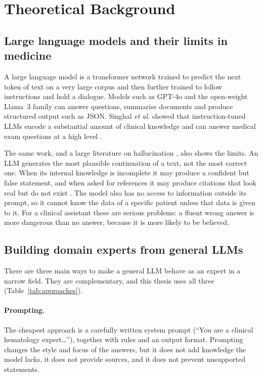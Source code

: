 \section{Theoretical Background}\label{sec:background}

\subsection{Large language models and their limits in medicine}

A large language model is a transformer network trained to predict the next token of text on a very large corpus and then further trained to follow instructions and hold a dialogue. Models such as GPT-4o \cite{openai2024gpt4o} and the open-weight Llama~3 family \cite{grattafiori2024llama3} can answer questions, summarise documents and produce structured output such as JSON. Singhal \emph{et al.} showed that instruction-tuned LLMs encode a substantial amount of clinical knowledge and can answer medical exam questions at a high level \cite{singhal2023}.

The same work, and a large literature on hallucination \cite{ji2023}, also shows the limits. An LLM generates the most plausible continuation of a text, not the most correct one. When its internal knowledge is incomplete it may produce a confident but false statement, and when asked for references it may produce citations that look real but do not exist \cite{walters2023}. The model also has no access to information outside its prompt, so it cannot know the data of a specific patient unless that data is given to it. For a clinical assistant these are serious problems: a fluent wrong answer is more dangerous than no answer, because it is more likely to be believed.

\subsection{Building domain experts from general LLMs}\label{sec:bg-expert}

There are three main ways to make a general LLM behave as an expert in a narrow field. They are complementary, and this thesis uses all three (Table~\ref{tab:approaches}).

\paragraph{Prompting.} The cheapest approach is a carefully written system prompt (``You are a clinical hematology expert\ldots''), together with rules and an output format. Prompting changes the style and focus of the answers, but it does not add knowledge the model lacks, it does not provide sources, and it does not prevent unsupported statements.

